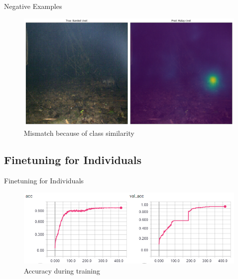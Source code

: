 \documentclass[10pt]{beamer}
\begin{document}
\begin{frame}{Negative Examples}
	\centering
	\begin{figure}
		\includegraphics[width=\columnwidth]{images/mismatch.png}
		\caption{Mismatch because of class similarity}
	\end{figure}
\end{frame}

\subsection{Finetuning for Individuals}

\begin{frame}{Finetuning for Individuals}
	\centering
	\begin{figure}
		\includegraphics[width=.9\columnwidth,height=\textheight,keepaspectratio]{images/Acc_finetune_leo_both.png}
		\caption{Accuracy during training}
	\end{figure}
\end{frame}

\end{document}
